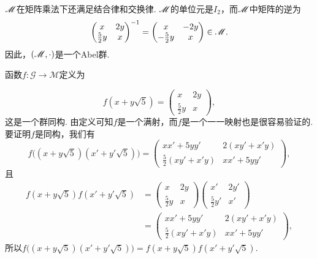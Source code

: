 \begin{solution}
  $\mathscr M$在矩阵乘法下还满足结合律和交换律. $\mathscr M$的单位元是$I_2$，而$\mathscr M$中矩阵的逆为
  \[
    \begin{pmatrix}
      x & 2y \\
      \frac52y & x
    \end{pmatrix}^{-1} =
    \begin{pmatrix}
      x & -2y \\
      -\frac52y & x
    \end{pmatrix} \in \mathscr M.
  \]
  因此，$(\mathscr M,\cdot)$是一个Abel群.

  \begin{enuma}\setcounter{enumi}{2}
    \item 函数$f:\mathscr G\to\mathscr M$定义为
  \end{enuma}
  \[
    f(x+y\sqrt5) = \begin{pmatrix}
      x & 2y \\
      \frac52y & x
    \end{pmatrix},
  \]
  这是一个群同构. 由定义可知$f$是一个满射，而$f$是一个一一映射也是很容易验证的. 要证明$f$是同构，我们有
  \[
    f\big( (x+y\sqrt5)(x'+y'\sqrt5) \big) =
    \begin{pmatrix}
      xx' + 5yy' & 2(xy'+x'y) \\
      \frac52(xy'+x'y) & xx' + 5yy'
    \end{pmatrix},
  \]
  且
  \begin{align*}
    f(x+y\sqrt5) f(x'+y'\sqrt5) & =
    \begin{pmatrix}
      x & 2y \\
      \frac52y & x
    \end{pmatrix}
    \begin{pmatrix}
      x' & 2y' \\
      \frac52y' & x'
    \end{pmatrix} \\
    & = \begin{pmatrix}
      xx' + 5yy' & 2(xy'+x'y) \\
      \frac52(xy'+x'y) & xx' + 5yy'
    \end{pmatrix},
  \end{align*}
  所以$f\big( (x+y\sqrt5)(x'+y'\sqrt5) \big)=
  f(x+y\sqrt5) f(x'+y'\sqrt5)$.
\end{solution}

